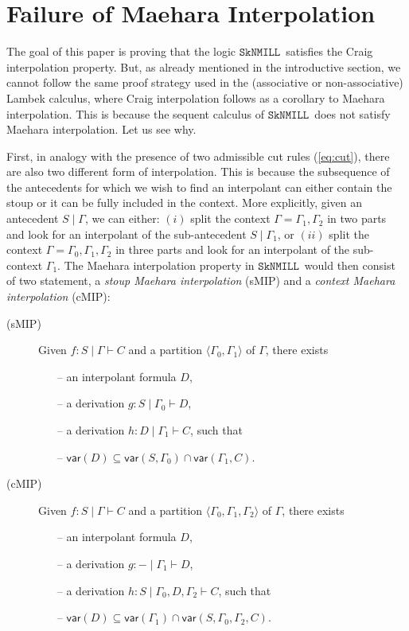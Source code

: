 \documentclass[sn-mathphys-num]{sn-jnl}%
\newcommand{\GG}{\Gamma}
\newcommand{\vd}{\vdash}
\newcommand{\SkNMILL}{$\mathtt{SkNMILL}$}
\newcommand{\mf}[1]{\mathsf{#1}}
\newcommand{\vars}[1]{\mf{var} (#1)}
\newcommand{\sMIP}{\textsf{sMIP}}
\newcommand{\cMIP}{\textsf{cMIP}}
\theoremstyle{thmstyleone}%
\theoremstyle{thmstyletwo}%
\theoremstyle{thmstylethree}%
\begin{document}
\section{Failure of Maehara Interpolation}\label{sec:failure}

The goal of this paper is proving that the logic \SkNMILL~satisfies the Craig interpolation property. But, as already mentioned in the introductive section, we cannot follow the same proof strategy used in the (associative or non-associative) Lambek calculus, where Craig interpolation follows as a corollary to Maehara interpolation. This is because the sequent calculus of \SkNMILL~does not satisfy Maehara interpolation. Let us see why.

First, in analogy with the presence of two admissible cut rules (\ref{eq:cut}), there are also two different form of interpolation. This is because the subsequence of the antecedents for which we wish to find an interpolant can either contain the stoup or it can be fully included in the context. More explicitly, given an antecedent $S \mid \GG$, we can either: $(i)$ split the context $\GG = \GG_1,\GG_2$ in two parts and look for an interpolant of the sub-antecedent $S \mid \GG_1$, or $(ii)$ split the context $\GG = \GG_0,\GG_1,\GG_2$ in three parts and look for an interpolant of the sub-context $\GG_1$.
The Maehara interpolation property in \SkNMILL~would then consist of two statement, a \emph{stoup Maehara interpolation} (\sMIP) and a \emph{context Maehara interpolation} (\cMIP):
\begin{description}
  \item[(\sMIP)] Given $f: S \mid \GG \vd C$ and a partition $\langle \GG_0,\GG_1 \rangle$ of $\GG$, there exists  
  \begin{itemize}
    \item[--] an interpolant formula $D$,
    \item[--] a derivation $g : S \mid \GG_0 \vd D$,
    \item[--] a derivation $h : D \mid \GG_1 \vd C$, such that
    \item[--] $\vars{D} \subseteq \vars{S , \GG_0} \cap \vars{\GG_1 , C}$.
  \end{itemize}
  \item[(\cMIP)] Given $f: S \mid \GG \vd C$ and a partition $\langle \GG_0,\GG_1, \GG_2 \rangle$ of $\GG$, there exists  
  \begin{itemize}
    \item[--] an interpolant formula $D$,
    \item[--] a derivation $g : {-} \mid \GG_1 \vd D$,
    \item[--] a derivation $h : S \mid \GG_0, D, \GG_2 \vd C$, such that
    \item[--] $\vars{D} \subseteq \vars{\GG_1} \cap \vars{S , \GG_0 , \GG_2 , C}$.    
  \end{itemize}
\end{description}
\end{document}
